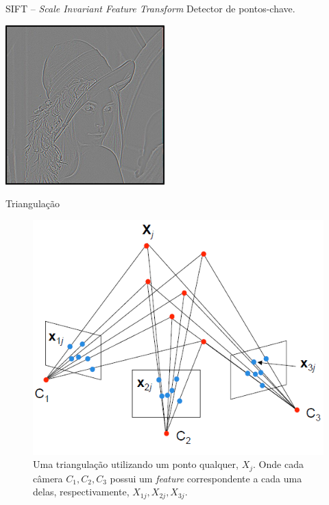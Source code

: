 \documentclass[table, usenames, svgnames, xcolor=dvipsnames]{beamer}
\begin{document}
\begin{frame}
	\begin{center}
		{SIFT -- \emph{Scale Invariant Feature Transform}}
		Detector de pontos-chave.
	\end{center}
\end{frame}

\begin{frame}
	\begin{center}
	 	\includegraphics[width=0.8\linewidth]{figs/lenaDoG.png}
	\end{center}
\end{frame}


\begin{frame}
	\begin{center}
	Triangulação
		\begin{figure} [!h]
	\centering
	\includegraphics[width=0.45\linewidth]{figs/triangulacao.png}
	\caption{%
	Uma triangulação utilizando um ponto qualquer, $X_j$. Onde cada câmera $C_1, C_2, C_3$ possui um \emph{feature} correspondente a cada uma delas, respectivamente, $X_{1j}, X_{2j}, X_{3j}$.
	}\label{fig:triangulacao}
\end{figure}
	\end{center}
\end{frame}
\end{document}
